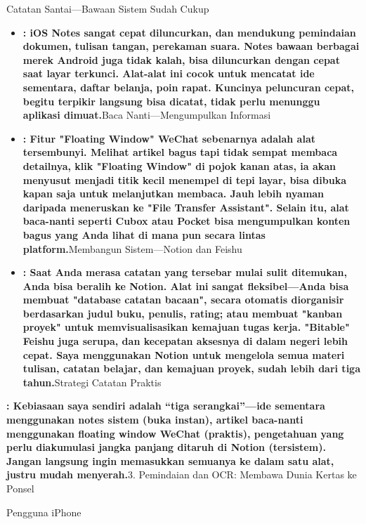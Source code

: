 Catatan Santai—Bawaan Sistem Sudah Cukup

\begin{itemize}
  \item \textbf{: iOS Notes sangat cepat diluncurkan, dan mendukung pemindaian dokumen, tulisan tangan, perekaman suara. Notes bawaan berbagai merek Android juga tidak kalah, bisa diluncurkan dengan cepat saat layar terkunci. Alat-alat ini cocok untuk mencatat ide sementara, daftar belanja, poin rapat. Kuncinya peluncuran cepat, begitu terpikir langsung bisa dicatat, tidak perlu menunggu aplikasi dimuat.}Baca Nanti—Mengumpulkan Informasi
  \item \textbf{: Fitur "Floating Window" WeChat sebenarnya adalah alat tersembunyi. Melihat artikel bagus tapi tidak sempat membaca detailnya, klik "Floating Window" di pojok kanan atas, ia akan menyusut menjadi titik kecil menempel di tepi layar, bisa dibuka kapan saja untuk melanjutkan membaca. Jauh lebih nyaman daripada meneruskan ke "File Transfer Assistant". Selain itu, alat baca-nanti seperti Cubox atau Pocket bisa mengumpulkan konten bagus yang Anda lihat di mana pun secara lintas platform.}Membangun Sistem—Notion dan Feishu
  \item \textbf{: Saat Anda merasa catatan yang tersebar mulai sulit ditemukan, Anda bisa beralih ke Notion. Alat ini sangat fleksibel—Anda bisa membuat "database catatan bacaan", secara otomatis diorganisir berdasarkan judul buku, penulis, rating; atau membuat "kanban proyek" untuk memvisualisasikan kemajuan tugas kerja. "Bitable" Feishu juga serupa, dan kecepatan aksesnya di dalam negeri lebih cepat. Saya menggunakan Notion untuk mengelola semua materi tulisan, catatan belajar, dan kemajuan proyek, sudah lebih dari tiga tahun.}Strategi Catatan Praktis
\end{itemize}

\textbf{: Kebiasaan saya sendiri adalah “tiga serangkai”—ide sementara menggunakan notes sistem (buka instan), artikel baca-nanti menggunakan floating window WeChat (praktis), pengetahuan yang perlu diakumulasi jangka panjang ditaruh di Notion (tersistem). Jangan langsung ingin memasukkan semuanya ke dalam satu alat, justru mudah menyerah.}3. Pemindaian dan OCR: Membawa Dunia Kertas ke Ponsel


Pengguna iPhone

